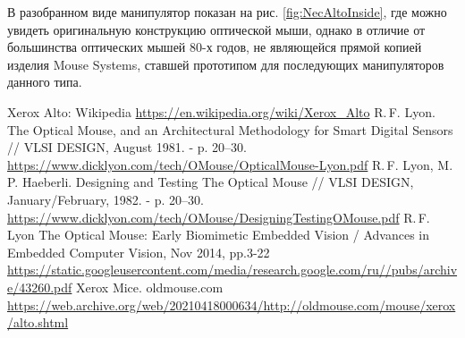 \documentclass[11pt, a4paper]{article}
\begin{document}
В разобранном виде манипулятор показан на рис. \ref{fig:NecAltoInside}, где можно увидеть оригинальную конструкцию оптической мыши, однако в отличие от большинства оптических мышей 80-х годов, не являющейся прямой копией изделия Mouse Systems, ставшей прототипом для последующих манипуляторов данного типа.
    
\begin{thebibliography}{9}
 Xerox Alto: Wikipedia \url{https://en.wikipedia.org/wiki/Xerox_Alto}
 R.\,F. Lyon. The Optical Mouse, and an Architectural Methodology for
Smart Digital Sensors // VLSI DESIGN, August 1981. - p. 20--30. \url{https://www.dicklyon.com/tech/OMouse/OpticalMouse-Lyon.pdf}
 R.\,F. Lyon, M.\,P. Haeberli. Designing and Testing The Optical Mouse // VLSI DESIGN, January/February, 1982. - p. 20--30. \url{https://www.dicklyon.com/tech/OMouse/DesigningTestingOMouse.pdf}
 R.\,F. Lyon The Optical Mouse: Early Biomimetic Embedded Vision / Advances in Embedded Computer Vision, Nov 2014, pp.3-22 \url{https://static.googleusercontent.com/media/research.google.com/ru//pubs/archive/43260.pdf}
 Xerox Mice. oldmouse.com \url{https://web.archive.org/web/20210418000634/http://oldmouse.com/mouse/xerox/alto.shtml}
\end{thebibliography}
\end{document}
